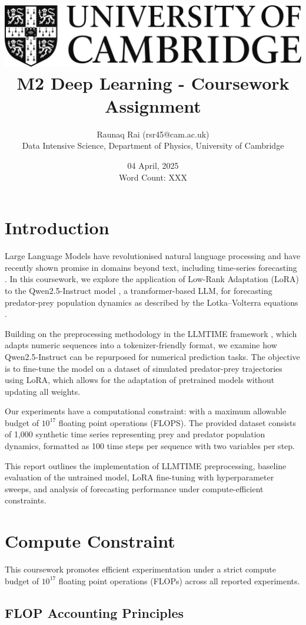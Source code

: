 \documentclass[a4paper,12pt]{article}
\title{
    \includegraphics[scale=0.4]{Cam_logo_bw.png}\\
    \vspace{0.5cm}
    M2 Deep Learning - Coursework Assignment
}
\author{Raunaq Rai (rsr45@cam.ac.uk)\\
    Data Intensive Science, Department of Physics, University of Cambridge
}
\date{04 April, 2025 \\ \vspace{0.2cm} {\small Word Count: XXX}}
\begin{document}
\maketitle

\section*{Introduction}

Large Language Models have revolutionised natural language processing and have recently shown promise in domains beyond text, including time-series forecasting \citep{gruver2023language}. In this coursework, we explore the application of Low-Rank Adaptation (LoRA) \citep{hu2021lora} to the Qwen2.5-Instruct model \citep{qwen2.5}, a transformer-based LLM, for forecasting predator-prey population dynamics as described by the Lotka–Volterra equations \citep{takeuchi2006lotka}.

Building on the preprocessing methodology in the LLMTIME framework \citep{gruver2023language}, which adapts numeric sequences into a tokenizer-friendly format, we examine how Qwen2.5-Instruct can be repurposed for numerical prediction tasks. The objective is to fine-tune the model on a dataset of simulated predator-prey trajectories using LoRA, which allows for the adaptation of pretrained models without updating all weights.

Our experiments have a computational constraint: with a maximum allowable budget of $10^{17}$ floating point operations (FLOPS). The provided dataset consists of 1,000 synthetic time series representing prey and predator population dynamics, formatted as 100 time steps per sequence with two variables per step.

This report outlines the implementation of LLMTIME preprocessing, baseline evaluation of the untrained model, LoRA fine-tuning with hyperparameter sweeps, and analysis of forecasting performance under compute-efficient constraints.

\section{Compute Constraint}

This coursework promotes efficient experimentation under a strict compute budget of $10^{17}$ floating point operations (FLOPs) across all reported experiments.

\subsection*{FLOP Accounting Principles}
\end{document}
